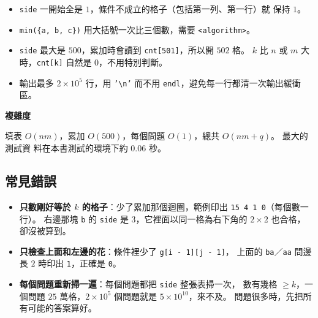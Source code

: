 
\begin{itemize}
\item \texttt{side} 一開始全是 $1$，條件不成立的格子（包括第一列、第一行）就
保持 $1$。
\item \texttt{min(\{a, b, c\})} 用大括號一次比三個數，需要
\texttt{<algorithm>}。
\item \texttt{side} 最大是 $500$，累加時會讀到 \texttt{cnt[501]}，所以開
$502$ 格。 $k$ 比 $n$ 或 $m$ 大時，\texttt{cnt[k]} 自然是 $0$，不用特別判斷。
\item 輸出最多 $2 \times 10^5$ 行，用 \texttt{'\textbackslash n'} 而不用
\texttt{endl}，避免每一行都清一次輸出緩衝區。
\end{itemize}

\textbf{複雜度}

填表 $O(nm)$，累加 $O(500)$，每個問題 $O(1)$，總共 $O(nm + q)$。 最大的測試資
料在本書測試的環境下約 $0.06$ 秒。

\subsection{常見錯誤}

\begin{itemize}
\item \textbf{只數剛好等於 $k$ 的格子}：少了累加那個迴圈，範例印出
\texttt{15 4 1 0}（每個數一行）。 右邊那塊 \texttt{b} 的 \texttt{side} 是
$3$，它裡面以同一格為右下角的 $2 \times 2$ 也合格，卻沒被算到。
\item \textbf{只檢查上面和左邊的花}：條件裡少了 \texttt{g[i - 1][j - 1]}，
上面的 \texttt{ba}／\texttt{aa} 問邊長 $2$ 時印出 \texttt{1}，正確是 \texttt{0}。
\item \textbf{每個問題重新掃一遍}：每個問題都把 \texttt{side} 整張表掃一次，
數有幾格 $\ge k$，一個問題 $25$ 萬格，$2 \times 10^5$ 個問題就是 $5 \times
10^{10}$，來不及。 問題很多時，先把所有可能的答案算好。
\end{itemize}

